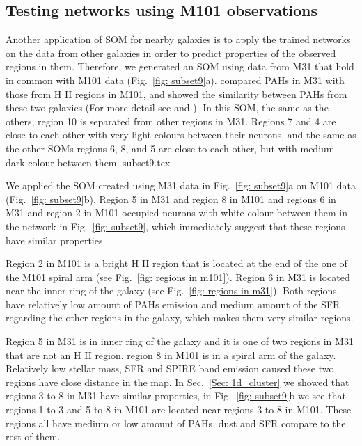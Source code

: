     \subsection{Testing networks using M101 observations}
    Another application of SOM for nearby galaxies is to apply the trained networks on the data from other galaxies in order to predict properties of the observed regions in them. %
    Therefore, we generated an SOM using data from M31 that hold in common with M101 data (Fig.~\ref{fig: subset9}a). 
    \cite{Dim15} compared PAHs in M31 with those from H {\sc II} regions in M101, and showed the similarity between PAHs from these two galaxies (For more detail see \cite{Dim15} and \cite{Gordon08}).
    In this SOM, the same as the others, region 10 is separated from other regions in M31.
    Regions 7 and 4 are close to each other with very light colours between their neurons, and the same as the other SOMs regions 6, 8, and 5 are close to each other, but with medium dark colour between them.
    {subset9.tex}
    
    We applied the SOM created using M31 data in Fig.~\ref{fig: subset9}a on M101 data (Fig.~\ref{fig: subset9}b).
    Region 5 in M31 and region 8 in M101 and regions 6 in M31 and region 2 in M101 occupied neurons with white colour between them in the network in Fig.~\ref{fig: subset9}, which immediately suggest that these regions have similar properties. 
    
    Region 2 in M101 is a bright H {\sc II} region that is located at the end of the one of the M101 spiral arm (see Fig.~\ref{fig: regions in m101}). 
    Region 6 in M31 is located near the inner ring of the galaxy (see Fig.~\ref{fig: regions in m31}).
    Both regions have relatively low amount of PAHs emission and medium amount of the SFR regarding the other regions in the galaxy, which makes them very similar regions.
    
    Region 5 in M31 is in inner ring of the galaxy and it is one of two regions in M31 that are not an  H {\sc II} region.
    region 8 in M101 is in a spiral arm of the galaxy.
    Relatively low stellar mass, SFR and SPIRE band emission caused these two regions have close distance in the map.
    In Sec.~\ref{Sec: 1d_cluster} we showed that regions 3 to 8 in M31 have similar properties, in Fig.~\ref{fig: subset9}b we see that regions 1 to 3 and 5 to 8 in M101 are located near regions 3 to 8 in M101. 
    These regions all have medium or low amount of PAHs, dust and SFR compare to the rest of them.
    
